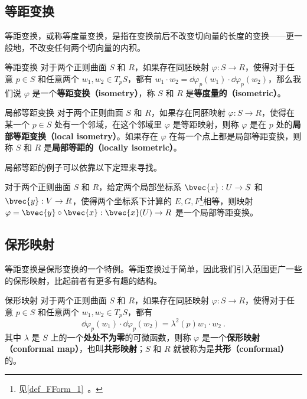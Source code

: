 
\subsection{等距变换}
等距变换，或称等度量变换，是指在变换前后不改变切向量的长度的变换——更一般地，不改变任何两个切向量的内积。

\begin{definition}{等距变换}
对于两个正则曲面 $S$ 和 $R$，如果存在同胚映射 $\varphi:S\to R$，使得对于任意 $p\in S$ 和任意两个 $w_1, w_2\in T_pS$，都有 $w_1\cdot w_2=\dd\varphi_p(w_1)\cdot\dd\varphi_p(w_2)$，那么我们说 $\varphi$ 是一个\textbf{等距变换（isometry）}，称 $S$ 和 $R$ 是\textbf{等度量的（isometric）}。
\end{definition}

\begin{definition}{局部等距变换}
对于两个正则曲面 $S$ 和 $R$，如果存在同胚映射 $\varphi:S\to R$，使得在某一个 $p\in S$ 处有一个邻域，在这个邻域里 $\varphi$ 是等距映射，则称 $\varphi$ 是在 $p$ 处的\textbf{局部等距变换（local isometry）}。如果存在 $\varphi$ 在每一个点上都是局部等距变换，则称 $S$ 和 $R$ 是\textbf{局部等距的（locally isometric）}。
\end{definition}

局部等距的例子可以依靠以下定理来寻找。

\begin{theorem}{}
对于两个正则曲面 $S$ 和 $R$，给定两个局部坐标系 $\bvec{x}:U\to S$ 和 $\bvec{y}:V\to R$，使得两个坐标系下计算的 $E, G, F$\footnote{见\autoref{def_FForm_1}~。}相等，则映射 $\varphi=\bvec{y}\circ\bvec{x}:\bvec{x}(U)\to R$ 是一个局部等距变换。
\end{theorem}

\subsection{保形映射}

等距变换是保形变换的一个特例。等距变换过于简单，因此我们引入范围更广一些的保形映射，比起前者有更多有趣的结构。

\begin{definition}{保形映射}
对于两个正则曲面 $S$ 和 $R$，如果存在同胚映射 $\varphi:S\to R$，使得对于任意 $p\in S$ 和任意两个 $w_1, w_2\in T_pS$，都有\begin{equation}
\dd\varphi_p(w_1)\cdot\dd\varphi_p(w_2)=\lambda^2(p)w_1\cdot w_2~.
\end{equation}
其中 $\lambda$ 是 $S$ 上的一个\textbf{处处不为零}的可微函数，则称 $\varphi$ 是一个\textbf{保形映射（conformal map）}，也叫\textbf{共形映射}；$S$ 和 $R$ 就被称为是\textbf{共形（conformal）}的。
\end{definition}

